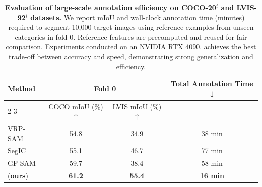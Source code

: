 \begin{table}[h]
  \caption{\textbf{Evaluation of large-scale annotation efficiency on COCO-20$^i$ and LVIS-92$^i$ datasets.} We report mIoU and wall-clock annotation time (minutes) required to segment 10,000 target images using reference examples from unseen categories in fold 0. Reference features are precomputed and reused for fair comparison. Experiments conducted on an NVIDIA RTX 4090. \ours{} achieves the best trade-off between accuracy and speed, demonstrating strong generalization and efficiency.}
  \vspace{3pt}
  \centering
  \begin{tabular}{lccc}
    \toprule
    \multirow{2}{*}{Method} & \multicolumn{2}{c}{Fold 0} & \multirow{2}{*}{Total Annotation Time ↓}  \\
    \cmidrule{2-3} & COCO mIoU (\%) ↑ & LVIS mIoU (\%) ↑ &\\
    \midrule
    VRP-SAM \cite{sun2024vrp}   & 54.8 & 34.9 & 38 min \\
    SegIC \cite{meng2024segic}  & 55.1 & 46.7 & 77 min \\
    GF-SAM \cite{zhang2024bridge} & 59.7 & 38.4 & 58 min \\
    \ours{} (\textbf{ours})                     & \textbf{61.2} & \textbf{55.4} & \textbf{16 min} \\
    \bottomrule
  \end{tabular}
  \label{tab:fast_annotation}
\end{table}
